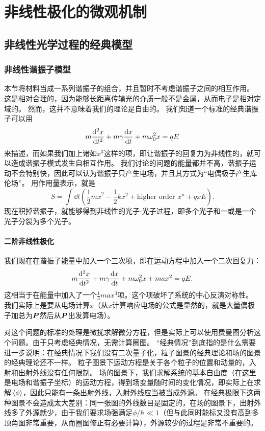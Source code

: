 \chapter{非线性极化的微观机制}

\section{非线性光学过程的经典模型}\label{sec:classical-models}

\subsection{非线性谐振子模型}\label{sec:classical-oscillator}

本节将材料当成一系列谐振子的组合，并且暂时不考虑谐振子之间的相互作用。
这是相对合理的，因为能够长距离传输光的介质一般不是金属，从而电子是相对定域的。
然而，这并不意味着我们的理论是自由的。
我们知道一个标准的经典谐振子可以用
\begin{equation}
    m \dv[2]{x}{t} + m \gamma \dv{x}{t} + m \omega_0^2 x = q E
\end{equation}
来描述，而如果我们加上诸如$x^3$这样的项，即让谐振子的回复力为非线性的，就可以造成谐振子模式发生自相互作用。
我们讨论的问题的能量都并不高，谐振子运动不会特别快，因此可以认为谐振子只产生电场，并且其方式为“电偶极子产生库伦场”。
用作用量表示，就是%
\[
    S = \int \dd{t} \left( \frac{1}{2} m \dot{x}^2 - \frac{1}{2} k x^2 + \text{higher order $x^n$} + qxE \right).
\]
现在积掉谐振子，就能够得到非线性的光子-光子过程，即多个光子和一或是一个光子分裂为多个光子。

\subsubsection{二阶非线性极化}

我们现在在谐振子能量中加入一个三次项，即在运动方程中加入一个二次回复力：
\begin{equation}
    m \dv[2]{x}{t} + m \gamma \dv{x}{t} + m \omega_0^2 x + m a x^2 = q E.
    \label{eq:x3-eq}
\end{equation}
这相当于在能量中加入了一个$\frac{1}{3} m a x^3$项。这个项破坏了系统的中心反演对称性。
我们实际上是要从电场计算$x$（从$x$计算响应电场的公式是显然的，就是大量偶极子加总为$\vb*{P}$然后从$\vb*{P}$出发算电场）。

对这个问题的标准的处理是微扰求解微分方程，但是实际上可以使用费曼图分析这个问题。由于只考虑经典情况，无需计算圈图。
“经典情况”到底指的是什么需要进一步说明：在经典情况下我们没有二次量子化，粒子图景的经典理论和场的图景的经典理论还不一样。
粒子图景下运动方程是关于各个粒子的位置和动量的，入射和出射外线没有任何限制。
场的图景下，我们求解系统的基本自由度（在这里是电场和谐振子坐标）的运动方程，得到场变量随时间的变化情况，即实际上在求解$\expval*{\phi}$，因此只能有一条出射外线，入射外线应当被当成外源。
在经典极限下这两种图景不会造成太大差别：同一张图的外线数目是固定的，在场的图景下，出射外线多了外源就少，由于我们要求场强满足$\phi / \hbar \ll 1$（但与此同时能标又没有高到多顶角图非常重要，从而圈图修正有必要计算），外源较少的过程是非常不重要的。


